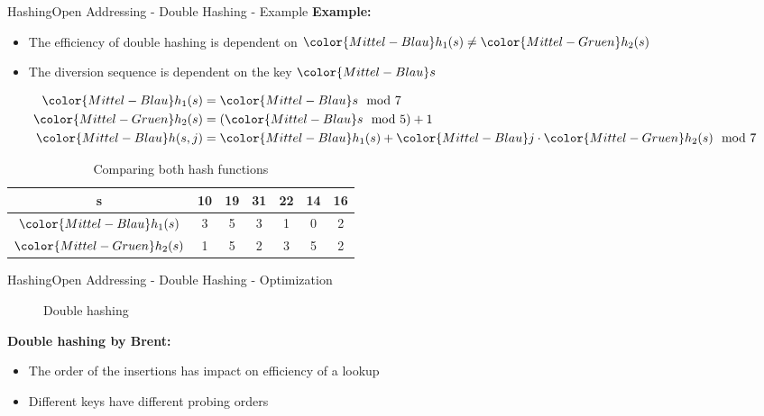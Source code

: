 
\begin{frame}{Hashing}{Open Addressing - Double Hashing - Example}
  \textbf{Example:}
  \begin{itemize}
    \item
      The efficiency of double hashing is dependent on
      \begin{math}
        {\color{Mittel-Blau}h_1(s)} \neq {\color{Mittel-Gruen}h_2(s)}
      \end{math}
    \item
      The diversion sequence is dependent on the key ${\color{Mittel-Blau}s}$
  \end{itemize}
  \begin{align*}
    {\color{Mittel-Blau}h_1(s)} &= {\color{Mittel-Blau}s} \mod 7\\
    {\color{Mittel-Gruen}h_2(s)}
      &= \left({\color{Mittel-Blau}s} \mod 5\right) + 1\\
    {\color{Mittel-Blau}h(s,j)}
      &= {\color{Mittel-Blau}h_1(s)}
      + {\color{Mittel-Blau}j} \cdot {\color{Mittel-Gruen}h_2(s)}
      \mod 7
  \end{align*}
  \begin{table}[!h]
    \caption{Comparing both hash functions}
    \begin{tabular}{c|cccccc}
      {\color{Mittel-Blau}s} & 10 & 19 & 31 & 22 & 14 & 16\\
      \midrule
      ${\color{Mittel-Blau}h_1(s)}$ & 3 & 5 & 3 & 1 & 0 & 2\\
      ${\color{Mittel-Gruen}h_2(s)}$ & 1 & 5 & 2 & 3 & 5 & 2
    \end{tabular}
  \end{table}
\end{frame}


\begin{frame}{Hashing}{Open Addressing - Double Hashing - Optimization}
  \vspace{-2.0em}
  \begin{figure}[!h]
    \begin{adjustbox}{width=0.9\linewidth}%
    \end{adjustbox}
    \vspace{-1.0em}
    \caption{Double hashing}%
    \label{fig:hashing:open_addressing:double_hashing_no_brent}%
  \end{figure}
  \textbf{Double hashing by Brent:}
  \begin{itemize}
    \item
      The order of the insertions has impact on efficiency of a lookup
    \item
      Different keys have different probing orders
  \end{itemize}
\end{frame}


